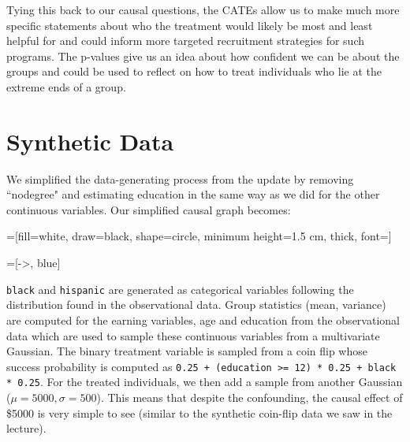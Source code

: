 \documentclass[12pt]{article}
\begin{document}
Tying this back to our causal questions, the CATEs allow us to make much more specific statements about who the treatment would likely be most and least helpful for and could inform more targeted recruitment strategies for such programs. The p-values give us an idea about how confident we can be about the groups and could be used to reflect on how to treat individuals who lie at the extreme ends of a group.  

\section{Synthetic Data}

We simplified the data-generating process from the update by removing ``nodegree" and estimating education in the same way as we did for the other continuous variables. Our simplified causal graph becomes:

=[fill=white, draw=black, shape=circle, minimum height=1.5 cm, thick, font=\ttfamily]

=[->, blue]

\begin{center}
\end{center}
\texttt{black} and \texttt{hispanic} are generated as categorical variables following the distribution found in the observational data. Group statistics (mean, variance) are computed for the earning variables, age and education from the observational data which are used to sample these continuous variables from a multivariate Gaussian.
The binary treatment variable is sampled from a coin flip whose success probability is computed as  \texttt{0.25 +  (education >= 12) * 0.25 + black * 0.25}.
For the treated individuals, we then add a sample from another Gaussian ($\mu = 5000, \sigma = 500$). This means that despite the confounding, the causal effect of \$5000 is very simple to see (similar to the synthetic coin-flip data we saw in the lecture).
\end{document}
